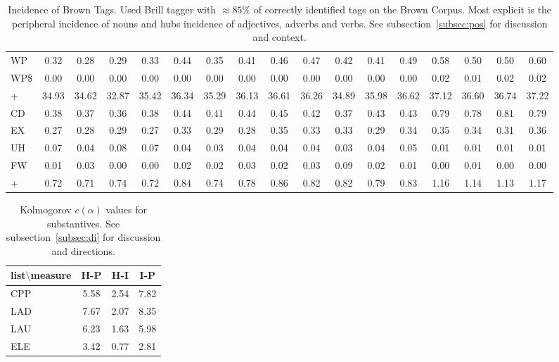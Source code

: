 \documentclass[%
 aip,
 jmp,%
 amsmath,amssymb,
 reprint,%
]{revtex4-1}
\begin{document}
\begin{table}
\begin{tabular}{|l|| c|c|c|c||  c|c|c|c||   c|c|c|c||   c|c|c|c|}
WP & 0.32 & 0.28 & 0.29 & 0.33 & 0.44 & 0.35 & 0.41 & 0.46 & 0.47 & 0.42 & 0.41 & 0.49 & 0.58 & 0.50 & 0.50 & 0.60\\
WP\$ & 0.00 & 0.00 & 0.00 & 0.00 & 0.00 & 0.00 & 0.00 & 0.00 & 0.00 & 0.00 & 0.00 & 0.00 & 0.02 & 0.01 & 0.02 & 0.02\\\hline
+ & 34.93 & 34.62 & 32.87 & 35.42 & 36.34 & 35.29 & 36.13 & 36.61 & 36.26 & 34.89 & 35.98 & 36.62 & 37.12 & 36.60 & 36.74 & 37.22\\\hline\hline
CD & 0.38 & 0.37 & 0.36 & 0.38 & 0.44 & 0.41 & 0.44 & 0.45 & 0.42 & 0.37 & 0.43 & 0.43 & 0.79 & 0.78 & 0.81 & 0.79\\
EX & 0.27 & 0.28 & 0.29 & 0.27 & 0.33 & 0.29 & 0.28 & 0.35 & 0.33 & 0.33 & 0.29 & 0.34 & 0.35 & 0.34 & 0.31 & 0.36\\
UH & 0.07 & 0.04 & 0.08 & 0.07 & 0.04 & 0.03 & 0.04 & 0.04 & 0.04 & 0.03 & 0.04 & 0.05 & 0.01 & 0.01 & 0.01 & 0.01\\
FW & 0.01 & 0.03 & 0.00 & 0.00 & 0.02 & 0.02 & 0.03 & 0.02 & 0.03 & 0.09 & 0.02 & 0.01 & 0.00 & 0.01 & 0.00 & 0.00\\\hline
+ & 0.72 & 0.71 & 0.74 & 0.72 & 0.84 & 0.74 & 0.78 & 0.86 & 0.82 & 0.82 & 0.79 & 0.83 & 1.16 & 1.14 & 1.13 & 1.17\\\hline\hline
  \end{tabular}
  \caption{Incidence of Brown Tags. Used Brill tagger with $\approx 85\%$ of correctly identified tags on the Brown Corpus. Most explicit is the peripheral incidence of nouns and hubs incidence of adjectives, adverbs and verbs. See subsection~\ref{subsec:pos} for discussion and context.}
  \label{tab:pos}
\end{table}



\begin{table}
  \centering
    \small
\setlength{\tabcolsep}{.26667em}
  \begin{tabular}{|l|| c|c|c|}\hline
list$\setminus$measure & H-P & H-I & I-P \\\hline
CPP & 5.58 & 2.54 & 7.82 \\\hline
LAD & 7.67 & 2.07 & 8.35 \\\hline
LAU & 6.23 & 1.63 & 5.98 \\\hline
ELE & 3.42 & 0.77 & 2.81 \\\hline
  \end{tabular}
  \caption{Kolmogorov $c(\alpha)$ values for substantives. See subsection~\ref{subsec:di} for discussion and directions.}
  \label{tab:kolSub}
\end{table}
\end{document}
